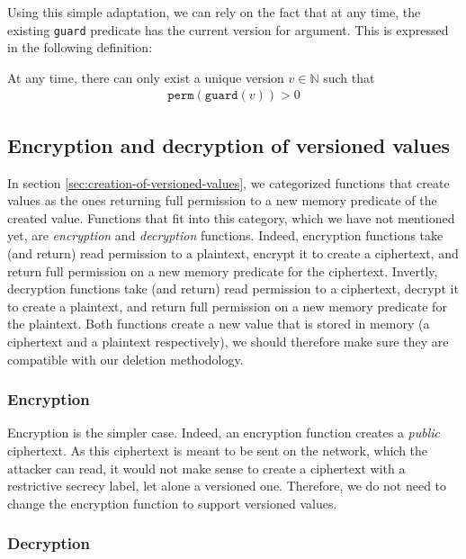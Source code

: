 Using this simple adaptation, we can rely on the fact that at any time, the existing \texttt{guard} predicate has the current version for argument.
This is expressed in the following definition:

\begin{definition}\label{def:unique-version}
    At any time, there can only exist a unique version $v \in \mathbb{N}$ such that
    \begin{align*}
        \texttt{perm}(\texttt{guard}(v)) > 0
    \end{align*}

\end{definition}

\subsection{Encryption and decryption of versioned values}

In section \ref{sec:creation-of-versioned-values}, we categorized functions that create values as the ones returning full permission to a new memory predicate of the created value.
Functions that fit into this category, which we have not mentioned yet, are \emph{encryption} and \emph{decryption} functions.
Indeed, encryption functions take (and return) read permission to a plaintext, encrypt it to create a ciphertext, and return full permission on a new memory predicate for the ciphertext.
Invertly, decryption functions take (and return) read permission to a ciphertext, decrypt it to create a plaintext, and return full permission on a new memory predicate for the plaintext.
Both functions create a new value that is stored in memory (a ciphertext and a plaintext respectively), we should therefore make sure they are compatible with our deletion methodology.

\subsubsection{Encryption}

Encryption is the simpler case. Indeed, an encryption function creates a \emph{public} ciphertext.
As this ciphertext is meant to be sent on the network, which the attacker can read, it would not make sense to create a ciphertext with a restrictive secrecy label, let alone a versioned one.
Therefore, we do not need to change the encryption function to support versioned values.

\subsubsection{Decryption}

